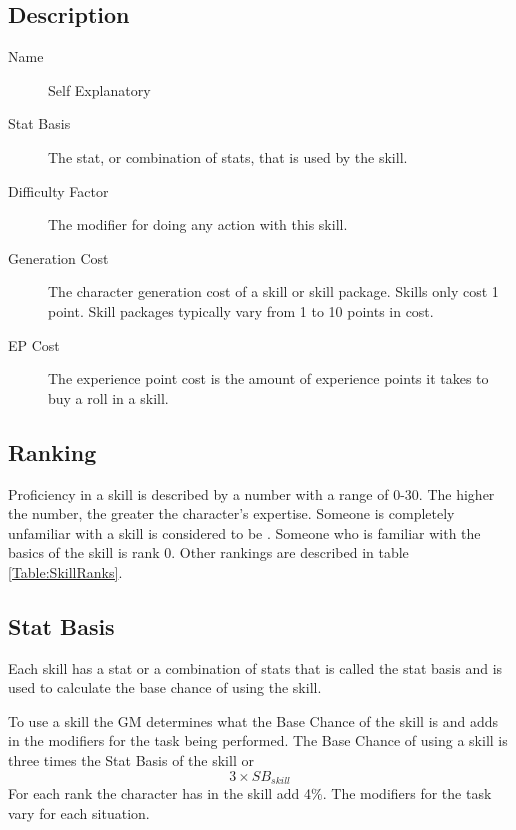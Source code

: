 \subsection{Description}

\begin{description}
	\item[Name] 
	Self Explanatory
	\item[Stat Basis] 
	The stat, or combination of stats, that is used by the skill. 
	\item[Difficulty Factor] 
	The modifier for doing any action with this skill.
	\item[Generation Cost]
	The character generation cost of a skill or skill package. Skills
	only cost 1 point. Skill packages typically vary from 1
	to 10 points in cost.
	\item[EP Cost] 
	The experience point cost is the amount of experience points it takes to
	buy a roll in a skill. 
\end{description}

\subsection{Ranking}

Proficiency in a skill is described by a number with a range of 0-30.
The higher the number, the greater the character's expertise. Someone
is completely unfamiliar with a skill is considered to be
. Someone who is familiar with the basics of
the skill is rank 0. Other rankings are described in table
\ref{Table:SkillRanks}.



\subsection{Stat Basis}

Each skill has a stat or a combination of stats that is called the
stat basis and is used to calculate the base chance of using the 
skill. 

To use a skill the GM determines what the Base Chance of the skill is 
and adds in the modifiers for the task being performed.
The Base Chance of using a skill is three times the Stat Basis of the skill
or \[ 3 \times SB_{skill} \] For each rank the character has in the skill add 4\%.
The modifiers for the task vary for each situation.

